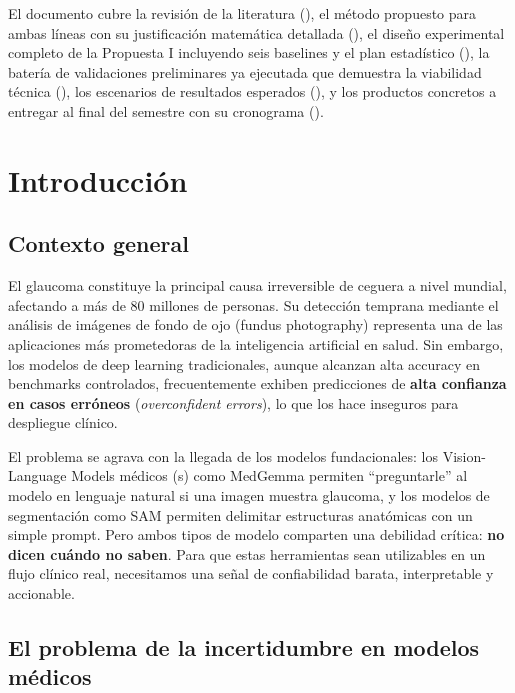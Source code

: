 \documentclass[12pt,a4paper]{article}
\newcommand{\MedVLM}{\text{MedVLM}}
\begin{document}
El documento cubre la revisión de la literatura (), el método propuesto para ambas líneas con su justificación matemática detallada (), el diseño experimental completo de la Propuesta I incluyendo seis baselines y el plan estadístico (), la batería de validaciones preliminares ya ejecutada que demuestra la viabilidad técnica (), los escenarios de resultados esperados (), y los productos concretos a entregar al final del semestre con su cronograma ().

\section{Introducción}

\subsection{Contexto general}

El glaucoma constituye la principal causa irreversible de ceguera a nivel mundial, afectando a más de 80 millones de personas.
Su detección temprana mediante el análisis de imágenes de fondo de ojo (fundus photography) representa una de las aplicaciones más prometedoras de la inteligencia artificial en salud.
Sin embargo, los modelos de deep learning tradicionales, aunque alcanzan alta accuracy en benchmarks controlados, frecuentemente exhiben predicciones de \textbf{alta confianza en casos erróneos} (\textit{overconfident errors}), lo que los hace inseguros para despliegue clínico.

El problema se agrava con la llegada de los modelos fundacionales: los Vision-Language Models médicos (\MedVLM s) como MedGemma permiten ``preguntarle'' al modelo en lenguaje natural si una imagen muestra glaucoma, y los modelos de segmentación como SAM permiten delimitar estructuras anatómicas con un simple prompt.
Pero ambos tipos de modelo comparten una debilidad crítica: \textbf{no dicen cuándo no saben}.
Para que estas herramientas sean utilizables en un flujo clínico real, necesitamos una señal de confiabilidad barata, interpretable y accionable.

\subsection{El problema de la incertidumbre en modelos médicos}
\end{document}
